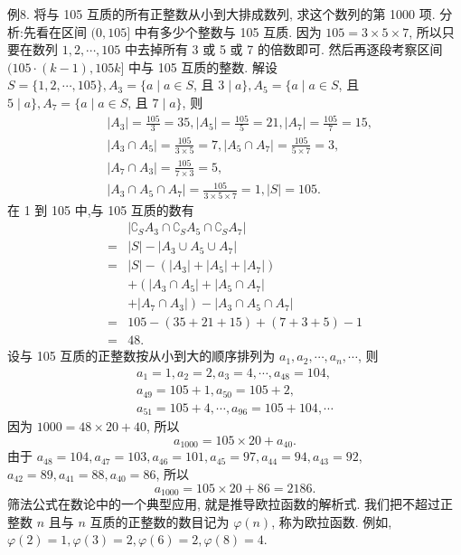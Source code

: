 例8. 将与 105 互质的所有正整数从小到大排成数列, 求这个数列的第 1000 项.
分析:先看在区间 $(0,105]$ 中有多少个整数与 105 互质.
因为 $105=3 \times 5 \times 7$, 所以只要在数列 $1,2, \cdots, 105$ 中去掉所有 3 或 5 或 7 的倍数即可.
然后再逐段考察区间 $(105 \cdot(k-1), 105 k]$ 中与 105 互质的整数.
解设 $S=\{1,2, \cdots, 105\}, A_3=\{a \mid a \in S$, 且 $3 \mid a\}, A_5=\{a \mid a \in S$, 且 $5 \mid a\}, A_7=\{a \mid a \in S$, 且 $7 \mid a\}$, 则
$$
\begin{aligned}
& \left|A_3\right|=\frac{105}{3}=35,\left|A_5\right|=\frac{105}{5}=21,\left|A_7\right|=\frac{105}{7}=15, \\
& \left|A_3 \cap A_5\right|=\frac{105}{3 \times 5}=7,\left|A_5 \cap A_7\right|=\frac{105}{5 \times 7}=3, \\
& \left|A_7 \cap A_3\right|=\frac{105}{7 \times 3}=5, \\
& \left|A_3 \cap A_5 \cap A_7\right|=\frac{105}{3 \times 5 \times 7}=1,|S|=105 .
\end{aligned}
$$
在 1 到 105 中,与 105 互质的数有
$$
\begin{aligned}
& \left|\complement_S A_3 \cap \complement_S A_5 \cap \complement_S A_7\right| \\
= & |S|-\left|A_3 \cup A_5 \cup A_7\right| \\
= & |S|-\left(\left|A_3\right|+\left|A_5\right|+\left|A_7\right|\right) \\
& +\left(\left|A_3 \cap A_5\right|+\left|A_5 \cap A_7\right|\right. \\
& \left.+\left|A_7 \cap A_3\right|\right)-\left|A_3 \cap A_5 \cap A_7\right| \\
= & 105-(35+21+15)+(7+3+5)-1 \\
= & 48 .
\end{aligned}
$$
设与 105 互质的正整数按从小到大的顺序排列为 $a_1, a_2, \cdots, a_n, \cdots$, 则
$$
\begin{gathered}
a_1=1, a_2=2, a_3=4, \cdots, a_{48}=104, \\
a_{49}=105+1, a_{50}=105+2, \\
a_{51}=105+4, \cdots, a_{96}=105+104, \cdots
\end{gathered}
$$
因为 $1000=48 \times 20+40$, 所以
$$
a_{1000}=105 \times 20+a_{40} .
$$
由于 $a_{48}=104, a_{47}=103, a_{46}=101, a_{45}=97, a_{44}=94, a_{43}=92$, $a_{42}=89, a_{41}=88, a_{40}=86$, 所以
$$
a_{1000}=105 \times 20+86=2186 .
$$
筛法公式在数论中的一个典型应用, 就是推导欧拉函数的解析式.
我们把不超过正整数 $n$ 且与 $n$ 互质的正整数的数目记为 $\varphi(n)$, 称为欧拉函数.
例如, $\varphi(2)=1, \varphi(3)=2, \varphi(6)=2, \varphi(8)=4$.



